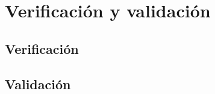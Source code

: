 
\chapter{Verificación y validación}
\label{cap:vv}


\section{Verificación}
\label{sec:verificacion}


\section{Validación}
\label{sec:validacion}

